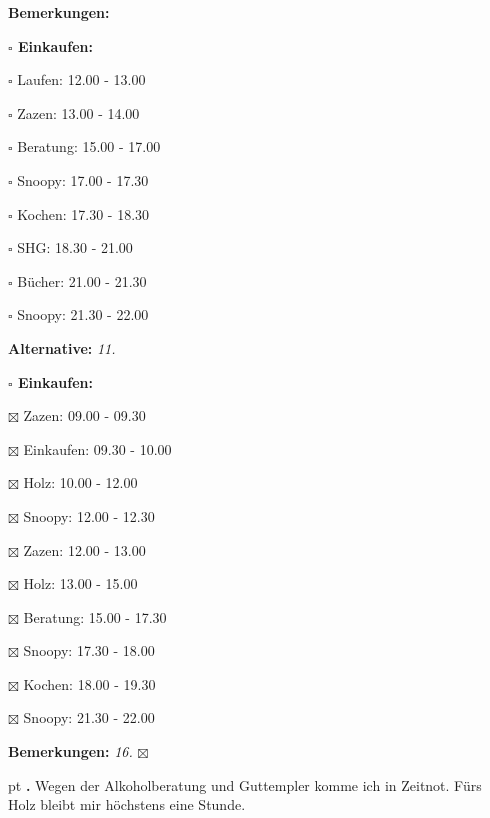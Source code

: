 \documentclass[10pt,a4paper]{article}
\newcounter{notec}
\newcommand\notep[1]{%
  \stepcounter{notec}
  \vskip #1pt
  {\bf\arabic{notec}.}
}
\newcommand\prop[1] {{\color {alizarin} {\bf #1}}}        %
\newcommand\mand[1] {{\color {burntorange} {\bf #1}}}     %
\newcommand\topspace{\vskip -15pt \hskip 20pt}
\newcommand\bottomspace{\vskip 4pt}
\newcommand\n[1] { {\sl #1.} \hskip 5pt }
\begin{document}
\begin{mdframed}[style=daystyle]
\begin{labeling}{{\mand {Bemerkungen:}}}
\begin{minipage}{0.75\textwidth}
\begin{labeling}{\prop {$\square$ {Einkaufen:}}}
      \item[$\square$ Laufen:]    12.00 - 13.00
      \item[$\square$ Zazen:]     13.00 - 14.00
      \item[$\square$ Beratung:]  15.00 - 17.00
        
      \item[$\square$ Snoopy:]    17.00 - 17.30
      \item[$\square$ Kochen:]    17.30 - 18.30
      \item[$\square$ SHG:]       18.30 - 21.00
      \item[$\square$ Bücher:]    21.00 - 21.30
        
      \item[$\square$ Snoopy:]    21.30 - 22.00
      \end{labeling}
    \end{minipage}
    \bottomspace
  \item[{\mand {Alternative:}}]    \n{11}
    \topspace
    \begin{minipage}{0.75\textwidth}  
      \begin{labeling}{\prop {$\square$ {Einkaufen:}}} 
        \setlength\itemsep{-3pt}
      \item[$\boxtimes$ Zazen:]     09.00 - 09.30
      \item[$\boxtimes$ Einkaufen:] 09.30 - 10.00
      \item[$\boxtimes$ Holz:]      10.00 - 12.00
      \item[$\boxtimes$ Snoopy:]    12.00 - 12.30
      \item[$\boxtimes$ Zazen:]     12.00 - 13.00
      \item[$\boxtimes$ Holz:]      13.00 - 15.00
      \item[$\boxtimes$ Beratung:]  15.00 - 17.30
      \item[$\boxtimes$ Snoopy:]    17.30 - 18.00
      \item[$\boxtimes$ Kochen:]    18.00 - 19.30
      \item[$\boxtimes$ Snoopy:]    21.30 - 22.00
      \end{labeling}
    \end{minipage}
    \bottomspace
  \item[{\mand {Bemerkungen:}}]    \n{16} $\boxtimes$
  \end{labeling}
    
  \setcounter{notec}{0}
  
  \notep 0 Wegen der Alkoholberatung und Guttempler komme ich in Zeitnot. Fürs
  Holz bleibt mir höchstens eine Stunde.


\end{mdframed}
\end{document}
